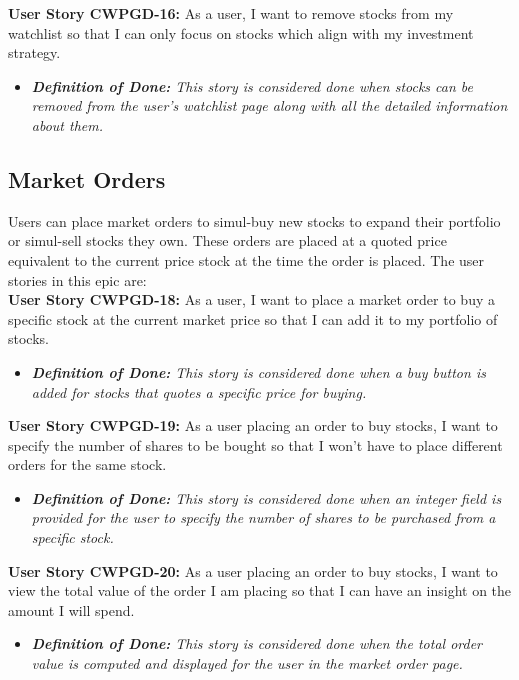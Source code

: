 \noindent \textbf{User Story CWPGD-16:} As a user, I want to remove stocks from my watchlist so that I can only focus on stocks which align with my investment strategy.
\begin{itemize}
	\item \textit{\textbf{Definition of Done:} This story is considered done when stocks can be removed from the user’s watchlist page along with all the detailed information about them.} 
\end{itemize}


\subsection{Market Orders}
    \label{subsec:market_orders}

Users can place market orders to simul-buy new stocks to expand their portfolio or simul-sell stocks they own. These orders are placed at a quoted price equivalent to the current price stock at the time the order is placed. The user stories in this epic are:\\

\noindent \textbf{User Story CWPGD-18:} As a user, I want to place a market order to buy a specific stock at the current market price so that I can add it to my portfolio of stocks.
\begin{itemize}
	\item \textit{\textbf{ Definition of Done:} This story is considered done when a buy button is added for stocks that quotes a specific price for buying.} 
\end{itemize}

\noindent \textbf{User Story CWPGD-19:} As a user placing an order to buy stocks, I want to specify the number of shares to be bought so that I won’t have to place different orders for the same stock.
\begin{itemize}
	\item \textit{\textbf{Definition of Done:} This story is considered done when an integer field is provided for the user to specify the number of shares to be purchased from a specific stock.} 
\end{itemize}

\noindent \textbf{User Story CWPGD-20:} As a user placing an order to buy stocks, I want to view the total value of the order I am placing so that I can have an insight on the amount I will spend.
\begin{itemize}
	\item \textit{\textbf{Definition of Done:} This story is considered done when the total order value is computed and displayed for the user in the market order page.} 
\end{itemize}

